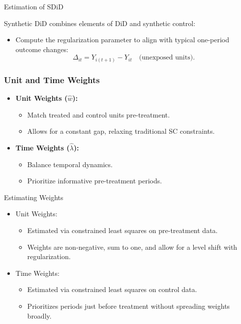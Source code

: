 \documentclass{beamer}
\begin{document}
\begin{frame}{Estimation of SDiD}

Synthetic DiD combines elements of DiD and synthetic control:
\begin{itemize}
    \item Compute the regularization parameter to align with typical one-period outcome changes:
    \[
    \Delta_{it} = Y_{i(t+1)} - Y_{it} \quad \text{(unexposed units)}.
    \]
\end{itemize}

\end{frame}





\begin{frame}
\frametitle{Unit and Time Weights}

\begin{itemize}
    \item \textbf{Unit Weights (\(\hat{w}\)):}
        \begin{itemize}
            \item Match treated and control units pre-treatment.
            \item Allows for a constant gap, relaxing traditional SC constraints.
        \end{itemize}
    \item \textbf{Time Weights (\(\hat{\lambda}\)):}
        \begin{itemize}
            \item Balance temporal dynamics.
            \item Prioritize informative pre-treatment periods.
        \end{itemize}
\end{itemize}

\end{frame}


\begin{frame}{Estimating Weights}

\begin{itemize}
    \item Unit Weights:
    \begin{itemize}
        \item Estimated via constrained least squares on pre-treatment data.
        \item Weights are non-negative, sum to one, and allow for a level shift with regularization.
    \end{itemize}
    \item Time Weights:
    \begin{itemize}
        \item Estimated via constrained least squares on control data.
        \item Prioritizes periods just before treatment without spreading weights broadly.
    \end{itemize}
\end{itemize}

\end{frame}
\end{document}
